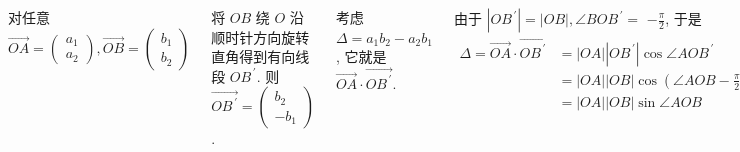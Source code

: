 \documentclass[10pt,punct]{ctexbeamer}
\begin{document}
\begin{frame}
    \begin{columns}[c]
        \column{8cm}

        对任意 $\overrightarrow{O A}=\left(\begin{array}{l}a_1 \\ a_2\end{array}\right), \overrightarrow{O B}=\left(\begin{array}{l}b_1 \\ b_2\end{array}\right)$

        将 $O B$ 绕 $O$ 沿顺时针方向旋转直角得到有向线 段 $O B^{\, \prime}$. 则 $\overrightarrow{O B^{\, \prime}}=\left(\begin{array}{r}b_2 \\ -b_1\end{array}\right)$.



        考虑$\Delta=a_1 b_2-a_2 b_1$, 它就是 $\overrightarrow{O A} \cdot \overrightarrow{O B^{\, \prime}}$.

        由于 $\left|O B^{\, \prime}\right|=|O B|, \angle B O B^{\, \prime}=$ $-\frac{\pi}{2}$, 于是
        $$
        \begin{aligned}
            \Delta=\overrightarrow{O A} \cdot \overrightarrow{O B^{\, \prime}}
            & = |O A|\left|O B^{\, \prime}\right| \cos \angle A O B^{\, \prime}\\
            & = |O A||O B| \cos \left(\angle A O B-\frac{\pi}{2}\right) \\
            & = |O A||O B| \sin \angle A O B
        \end{aligned}
        $$


        \column{4.5cm}
        \begin{figure}[p]
            \includegraphics[scale=0.4]{det-2.png}
        \end{figure}


\end{columns}
\end{frame}
\end{document}
